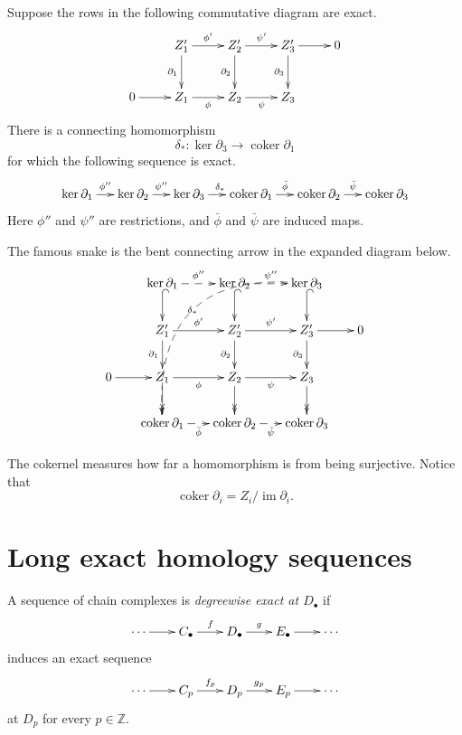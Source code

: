 \begin{lemma}
Suppose the rows in the following commutative
diagram are exact.
$$
\xymatrix@C=2.5em@R=2.6em{
  & Z'_1 \ar[r]^{\phi'}
    \ar[d]_{\partial_1}
  & Z'_2 \ar[r]^{\psi'}
    \ar[d]_{\partial_2}
  & Z'_3 \ar[r]
    \ar[d]_{\partial_3}
  & 0 \\
0 \ar[r]
  & Z_1 \ar[r]_{\phi}
  & Z_2 \ar[r]_{\psi}
  & Z_3
}
$$
There is a connecting homomorphism
$$
\delta_*:\ker\partial_3
\longrightarrow\operatorname{coker}\partial_1
$$
for which the following sequence is exact.
$$
\xymatrix@C=1.35em{
\ker\partial_1 \ar[r]^{\phi''}
  & \ker\partial_2 \ar[r]^{\psi''}
  & \ker\partial_3 \ar[r]^{\delta_*}
  & \operatorname{coker}\partial_1
    \ar[r]^{\bar\phi}
  & \operatorname{coker}\partial_2
    \ar[r]^{\bar\psi}
  & \operatorname{coker}\partial_3
}
$$
Here $\phi''$ and $\psi''$ are restrictions,
and $\bar\phi$ and $\bar\psi$ are induced
maps.

The famous snake is the bent connecting arrow
in the expanded diagram below.
$$
\xymatrix@C=1.7em@R=2.2em{
  & \ker\partial_1
    \ar@{^{(}->}[d]
    \ar@{-->}[r]^{\phi''}
  & \ker\partial_2
    \ar@{^{(}->}[d]
    \ar@{-->}[r]^{\psi''}
  & \ker\partial_3
    \ar@{^{(}->}[d]
    \ar@{-->}@/_4pc/[dddll]|{\delta_*}
  & \\
  & Z'_1 \ar[r]^{\phi'}
    \ar[d]_{\partial_1}
  & Z'_2 \ar[r]^{\psi'}
    \ar[d]_{\partial_2}
  & Z'_3 \ar[r]
    \ar[d]_{\partial_3}
  & 0 \\
0 \ar[r]
  & Z_1 \ar[r]_{\phi}
    \ar@{->>}[d]
  & Z_2 \ar[r]_{\psi}
    \ar@{->>}[d]
  & Z_3 \ar@{->>}[d]
  & \\
  & \operatorname{coker}\partial_1
    \ar@{-->}[r]_{\bar\phi}
  & \operatorname{coker}\partial_2
    \ar@{-->}[r]_{\bar\psi}
  & \operatorname{coker}\partial_3
}
$$
\end{lemma}

\begin{remark}
The cokernel measures how far a homomorphism
is from being surjective. Notice that
$$
\operatorname{coker}\partial_i
=Z_i/\operatorname{im}\partial_i.
$$
\end{remark}

\section{Long exact homology sequences}
\label{section-long-exact-homology}

\begin{definition}
A sequence of chain complexes is
\emph{degreewise exact at $D_\bullet$} if
$$
\xymatrix@C=2em{
\cdots \ar[r]
  & C_\bullet \ar[r]^f
  & D_\bullet \ar[r]^g
  & E_\bullet \ar[r]
  & \cdots
}
$$
induces an exact sequence
$$
\xymatrix@C=2em{
\cdots \ar[r]
  & C_p \ar[r]^{f_p}
  & D_p \ar[r]^{g_p}
  & E_p \ar[r]
  & \cdots
}
$$
at $D_p$ for every $p\in\mathbb{Z}$.
\end{definition}

